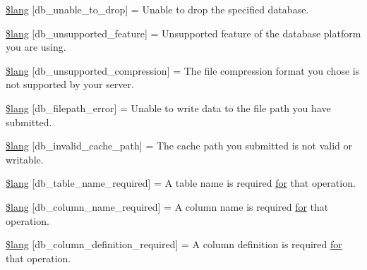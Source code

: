 \begin{DoxyCompactItemize}
\item 
\hyperlink{system_2language_2english_2db__lang_8php_af391f0d50d64cbb95cd733fa947fdb5e}{\$lang} \mbox{[}\textquotesingle{}db\+\_\+unable\+\_\+to\+\_\+drop\textquotesingle{}\mbox{]} = \textquotesingle{}Unable to drop the specified database.\textquotesingle{}
\item 
\hyperlink{system_2language_2english_2db__lang_8php_ac9a47dcf094e785346ea1834e63df941}{\$lang} \mbox{[}\textquotesingle{}db\+\_\+unsupported\+\_\+feature\textquotesingle{}\mbox{]} = \textquotesingle{}Unsupported feature of the database platform you are using.\textquotesingle{}
\item 
\hyperlink{system_2language_2english_2db__lang_8php_ae745d23d59478f529442768816df6f36}{\$lang} \mbox{[}\textquotesingle{}db\+\_\+unsupported\+\_\+compression\textquotesingle{}\mbox{]} = \textquotesingle{}The file compression format you chose is not supported by your server.\textquotesingle{}
\item 
\hyperlink{system_2language_2english_2db__lang_8php_a0519c50a806cec99f29b499aec2582e5}{\$lang} \mbox{[}\textquotesingle{}db\+\_\+filepath\+\_\+error\textquotesingle{}\mbox{]} = \textquotesingle{}Unable to write data to the file path you have submitted.\textquotesingle{}
\item 
\hyperlink{system_2language_2english_2db__lang_8php_a67157df2896b342e247ab744adf2b9e5}{\$lang} \mbox{[}\textquotesingle{}db\+\_\+invalid\+\_\+cache\+\_\+path\textquotesingle{}\mbox{]} = \textquotesingle{}The cache path you submitted is not valid or writable.\textquotesingle{}
\item 
\hyperlink{system_2language_2english_2db__lang_8php_a2899cf8f7246d7fa97660ea52856ade5}{\$lang} \mbox{[}\textquotesingle{}db\+\_\+table\+\_\+name\+\_\+required\textquotesingle{}\mbox{]} = \textquotesingle{}A table name is required \hyperlink{confirm__transfer_8php_aaf007b9fa5c90d7c5a7011bece9cfc15}{for} that operation.\textquotesingle{}
\item 
\hyperlink{system_2language_2english_2db__lang_8php_ac87ab86a1f105d87327480b6d0659b13}{\$lang} \mbox{[}\textquotesingle{}db\+\_\+column\+\_\+name\+\_\+required\textquotesingle{}\mbox{]} = \textquotesingle{}A column name is required \hyperlink{confirm__transfer_8php_aaf007b9fa5c90d7c5a7011bece9cfc15}{for} that operation.\textquotesingle{}
\item 
\hyperlink{system_2language_2english_2db__lang_8php_ad0ba270704ec81f8f89e486a18660354}{\$lang} \mbox{[}\textquotesingle{}db\+\_\+column\+\_\+definition\+\_\+required\textquotesingle{}\mbox{]} = \textquotesingle{}A column definition is required \hyperlink{confirm__transfer_8php_aaf007b9fa5c90d7c5a7011bece9cfc15}{for} that operation.\textquotesingle{}

\end{DoxyCompactItemize}
